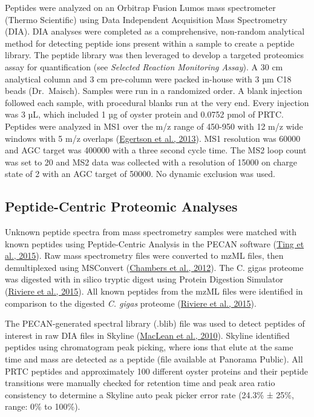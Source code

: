 \documentclass [11pt, proquest] {uwthesis}[2015/03/03]
\begin{document}
Peptides were analyzed on an Orbitrap Fusion Lumos mass spectrometer (Thermo Scientific) using Data Independent Acquisition Mass Spectrometry (DIA). DIA analyses were completed as a comprehensive, non-random analytical method for detecting peptide ions present within a sample to create a peptide library. The peptide library was then leveraged to develop a targeted proteomics assay for quantification (see \emph{Selected Reaction Monitoring Assay}). A 30 cm analytical column and 3 cm pre-column were packed in-house with 3 µm C18 beads (Dr.~Maisch). Samples were run in a randomized order. A blank injection followed each sample, with procedural blanks run at the very end. Every injection was 3 µL, which included 1 µg of oyster protein and 0.0752 pmol of PRTC. Peptides were analyzed in MS1 over the m/z range of 450-950 with 12 m/z wide windows with 5 m/z overlaps (\protect\hyperlink{ref-Egertson2013}{Egertson et al., 2013}). MS1 resolution was 60000 and AGC target was 400000 with a three second cycle time. The MS2 loop count was set to 20 and MS2 data was collected with a resolution of 15000 on charge state of 2 with an AGC target of 50000. No dynamic exclusion was used.

\hypertarget{peptide-centric-proteomic-analyses}{%
\subsection{Peptide-Centric Proteomic Analyses}\label{peptide-centric-proteomic-analyses}}

Unknown peptide spectra from mass spectrometry samples were matched with known peptides using Peptide-Centric Analysis in the PECAN software (\protect\hyperlink{ref-Ting2015}{Ting et al., 2015}). Raw mass spectrometry files were converted to mzML files, then demultiplexed using MSConvert (\protect\hyperlink{ref-Chambers2012}{Chambers et al., 2012}). The C. gigas proteome was digested with in silico tryptic digest using Protein Digestion Simulator (\protect\hyperlink{ref-Riviere2015}{Riviere et al., 2015}). All known peptides from the mzML files were identified in comparison to the digested \emph{C. gigas} proteome (\protect\hyperlink{ref-Riviere2015}{Riviere et al., 2015}).

The PECAN-generated spectral library (.blib) file was used to detect peptides of interest in raw DIA files in Skyline (\protect\hyperlink{ref-MacLean2010}{MacLean et al., 2010}). Skyline identified peptides using chromatogram peak picking, where ions that elute at the same time and mass are detected as a peptide (file available at Panorama Public). All PRTC peptides and approximately 100 different oyster proteins and their peptide transitions were manually checked for retention time and peak area ratio consistency to determine a Skyline auto peak picker error rate (24.3\% ± 25\%, range: 0\% to 100\%).
\end{document}
